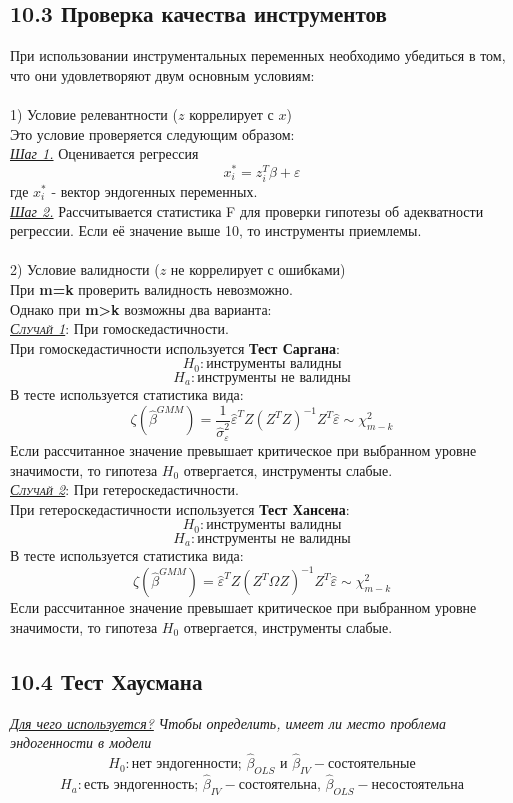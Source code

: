 \documentclass[a0,final]{a0poster}
\begin{document}
\begin{multicols}{4}
\subsection*{\textbf{10.3 Проверка качества инструментов}}
При использовании инструментальных переменных необходимо убедиться в том, что они удовлетворяют двум основным условиям:\\
\\
1) Условие релевантности ($z$ коррелирует с $x$) \\
Это условие проверяется следующим образом: \\
\underline{\textit{Шаг 1.}} Оценивается регрессия
$$x_i^*=z_i^T\beta + \varepsilon$$
где $x_i^*$ - вектор эндогенных переменных. \\
\underline{\textit{Шаг 2.}} Рассчитывается статистика F для проверки гипотезы об адекватности регрессии. Если её значение выше 10, то инструменты приемлемы.\\
\\
2) Условие валидности ($z$ не коррелирует с ошибками) \\
При \textbf{m=k} проверить валидность невозможно. \\
Однако при \textbf{m>k} возможны два варианта: \\

\underline{\textsc{\textit{Случай 1}}}: При гомоскедастичности. \\
При гомоскедастичности используется \textbf{Тест Саргана}:
$$H_0: \text{инструменты валидны}$$
$$H_a: \text{инструменты не валидны}$$
В тесте используется статистика вида:
$$\zeta(\hat{\beta}^{GMM})=\frac{1}{\hat{\sigma}^2_\varepsilon}\hat{\varepsilon}^TZ({Z^TZ})^{-1}Z^T\hat{\varepsilon}\sim\chi^2_{m-k}$$
Если рассчитанное значение превышает критическое при выбранном уровне значимости, то гипотеза $H_0$ отвергается, инструменты слабые.\\

\underline{\textsc{\textit{Случай 2}}}: При гетероскедастичности. \\
При гетероскедастичности используется \textbf{Тест Хансена}:
$$H_0: \text{инструменты валидны}$$
$$H_a: \text{инструменты не валидны}$$
В тесте используется статистика вида:
$$\zeta(\hat{\beta}^{GMM})=\hat{\varepsilon}^TZ({Z^T\hat{\Omega}Z})^{-1}Z^T\hat{\varepsilon}\sim\chi^2_{m-k}$$
Если рассчитанное значение превышает критическое при выбранном уровне значимости, то гипотеза $H_0$ отвергается, инструменты слабые.
\subsection*{\textbf{10.4 Тест Хаусмана}}
\underline{\textit{Для чего используется?}} \textit{Чтобы определить, имеет ли место проблема эндогенности в модели}
$$H_0: \text{нет эндогенности; } \hat{\beta}_{OLS} \text{ и } \hat{\beta}_{IV} - \text{состоятельные}$$
$$H_a: \text{есть эндогенность; } \hat{\beta}_{IV} - \text{состоятельна, }  \hat{\beta}_{OLS} - \text{несостоятельна}$$


\end{multicols}
\end{document}
